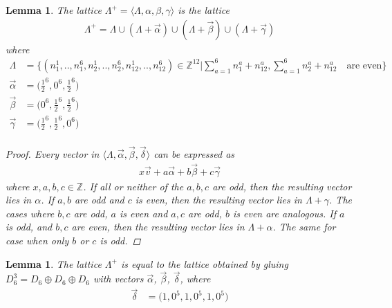 \documentclass{article}
\newcommand{\ZZ}{\mathbb{Z}}
\newcommand{\de}{\delta}
\theoremstyle{plain}
\newtheorem{lemma}[theorem]{Lemma}
\theoremstyle{definition}
\begin{document}
    \begin{lemma}
        The lattice $\Lambda^+=\langle \Lambda, \alpha, \beta, \gamma \rangle$ is the lattice
        \begin{align}
        \Lambda^+ = \Lambda \cup (\Lambda + \vec{\alpha}) \cup (\Lambda + \vec{\beta}) \cup (\Lambda + \vec{\gamma})
    \end{align}
    where 
    \begin{align}
        \Lambda &= \{ 
            (n_1^1, .., n_1^6, n_2^1, .., n_2^6, n_{12}^1, .., n_{12}^6) \in \ZZ^{12}
            \big | \sum_{a=1}^6 n_1^a + n_{12}^a, \sum_{a=1}^6 n_2^a + n_{12}^a \quad \text{are even}
        \} \\
        \vec{\alpha}&=\big(\frac{1}{2}^6, 0^6, \frac{1}{2}^6 \big) \\
        \vec{\beta}&=\big(0^6, \frac{1}{2}^6, \frac{1}{2}^6\big) \\
        \vec{\gamma}&=\big(\frac{1}{2}^6, \frac{1}{2}^6, 0^6\big) \\\
    \end{align}
    \begin{proof}
        Every vector in $\langle \Lambda, \vec \alpha, \vec \beta, \vec \de \rangle$
        can be expressed as 
        \begin{align}
            x \vec v + a \vec\alpha + b \vec\beta + c \vec\gamma
        \end{align}
        where $x, a, b, c \in \ZZ$. If all or neither of the $a, b, c$ are odd, 
        then the resulting vector
        lies in $\alpha$. If $a, b$ are odd and $c$ is even, then the resulting vector
        lies in $\Lambda + \gamma$. The cases where $b, c$ are odd, $a$ is even and $a, c$ are odd, 
        $b$ is even are analogous.
        If $a$ is odd, and $b, c$ are even, then the resulting vector lies in $\Lambda + \alpha$. 
        The same for case when only $b$ or $c$ is odd.
    \end{proof}
    
    \end{lemma}

    \begin{lemma}
    The lattice $\Lambda^+$ is equal to the lattice obtained by
    gluing $D_6^3=D_6 \oplus D_6 \oplus D_6$ with vectors $\vec{\alpha}$, $\vec{\beta}$, ${\vec{\de}}$, where 
    \begin{align}
        {\vec{\de}}&=\big(1,0^5, 1,0^5,1,0^5\big)
    \end{align}
    \end{lemma}
\end{document}
